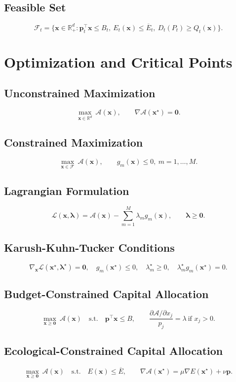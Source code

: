 \documentclass[11pt]{article}
\begin{document}
\subsection{Feasible Set}
\[
\mathcal{F}_t=\{\bm{x}\in\mathbb{R}^d_+: \bm{p}_t^\top\bm{x}\le B_t,\ E_t(\bm{x})\le\overline{E}_t,\ D_t(P_t)\ge Q_t(\bm{x})\}.
\]

\section{Optimization and Critical Points}

\subsection{Unconstrained Maximization}
\[
\max_{\bm{x}\in\mathbb{R}^d} \ \mathcal{A}(\bm{x}),
\qquad \nabla\mathcal{A}(\bm{x}^{\star})=\bm{0}.
\]

\subsection{Constrained Maximization}
\[
\max_{\bm{x}\in\mathcal{F}}\ \mathcal{A}(\bm{x}),
\qquad g_m(\bm{x})\le 0,\ m=1,\dots,M.
\]

\subsection{Lagrangian Formulation}
\[
\mathcal{L}(\bm{x},\bm{\lambda})=\mathcal{A}(\bm{x})-\sum_{m=1}^M\lambda_m g_m(\bm{x}),
\qquad \bm{\lambda}\ge\bm{0}.
\]

\subsection{Karush-Kuhn-Tucker Conditions}
\[
\nabla_{\bm{x}}\mathcal{L}(\bm{x}^{\star},\bm{\lambda}^{\star})=\bm{0},
\quad g_m(\bm{x}^{\star})\le 0,
\quad \lambda_m^{\star}\ge 0,
\quad \lambda_m^{\star}g_m(\bm{x}^{\star})=0.
\]

\subsection{Budget-Constrained Capital Allocation}
\[
\max_{\bm{x}\ge\bm{0}}\ \mathcal{A}(\bm{x})
\quad\text{s.t.}\quad \bm{p}^\top\bm{x}\le B,
\qquad \frac{\partial\mathcal{A}/\partial x_j}{p_j}=\lambda\ \text{if }x_j>0.
\]

\subsection{Ecological-Constrained Capital Allocation}
\[
\max_{\bm{x}\ge\bm{0}}\ \mathcal{A}(\bm{x})
\quad\text{s.t.}\quad E(\bm{x})\le \overline{E},
\qquad \nabla\mathcal{A}(\bm{x}^{\star})=\mu\nabla E(\bm{x}^{\star})+\nu\bm{p}.
\]
\end{document}
